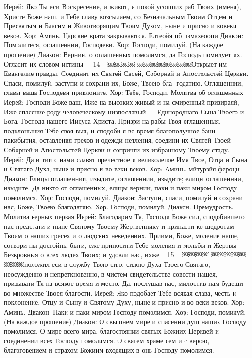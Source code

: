 Иерей: Яко Ты еси Воскресение, и живот, и покой усопших раб Твоих (имена), Христе Боже наш, и Тебе славу возсылаем, со Безначальным Твоим Отцем и Пресвятым и Благим и Животворящим Твоим Духом, ныне и присно и вовеки веков. Хор: Аминь.
Царские врата закрываются.
Елтеойя пб пзмахеооци
Диакон: Помолитеся, оглашеннии, Господеви.
Хор: Господи, помилуй. (На каждое прошение) Диакон: Вернии, о оглашенных помолимся, да Господь помилует их.
Огласит их словом истины.
~ 14 ~
￼￼￼￼
￼￼￼￼￼￼￼￼Открыет им Евангелие правды.
Соединит их Святей Своей, Соборней и Апостольстей Церкви. Спаси, помилуй, заступи и сохрани их, Боже, Твоею бла- годатию.
Оглашеннии, главы ваша Господеви приклоните.
Хор: Тебе, Господи.
Молитва об оглашенных
Иерей: Господи Боже ваш, Иже на высоких живый и на смиренный призираяй, Иже спасение роду человеческому низпославый — Единороднаго Сына Твоего и Бога, Господа нашего Иисуса Христа. Призри на рабы Твоя оглашенныя, подклоньшия Тебе своя выя, и сподоби я во время благополучное бани пакибытия, оставления грехов и одежди нетления, соедини их Святей Твоей Соборней и Апостольстей Церкви и сопричти их избранному Твоему стаду.
Иерей: Да и тии с нами славят пречестное и великолепое Имя Твое, Отца и Сына и Святаго Духа, ныне и присно и во веки веков.
Хор: Аминь.
мйтурзйя фероци
Диакон: Елицы оглашеннии, изыдите, оглашеннии, изыдите; елицы оглашеннии, изыдите. Да никто от оглашенных, елицы вернии, паки и паки миром Господу помолимся.
Хор: Господи, помилуй.
Диакон: Заступи, спаси, помилуй и сохрани нас, Боже, Твоею благодатию.
Хор: Господи, помилуй.
Диакон: Премудрость.
Молитва верных первая
Иерей: Благодарим Тя, Господи Боже сил, сподобившего нас предстати и ныне Святому Твоему Жертвеннику и припасти ко щедротам Твоим о наших гресех и о людских неведениих. Приими, Боже, моление наше, сотвори ны достойны быти, еже приносити Тебе моления и мольбы и Жертвы Безкровныя о всех людех Твоих; и удовли нас, ихже
~ 15 ~
￼￼￼￼
￼￼￼￼￼￼￼￼положил еси в службу Твою сию, силою Духа Твоего Святаго, неосужденно и непреткновенно, в чистем свидетельстве совести нашея, призывати Тя на всякое время и место. Да, послушав нас, милостив нам будеши во множестве Твоея благости.
Иерей: Яко подобает Тебе всякая слава, честь и поклонение, Отцу и Сыну и Святому Духу, ныне и присно и во веки веков. Хор: Аминь.
Диакон: Паки и паки миром Господу помолимся.
Хор: Господи, помилуй. (На каждое прошение)
Диакон: О свышнем мире и спасении душ наших Господу помолимся.
О мире всего мира, благостоянии святых Божиих Церквей и соединении всех Господу помолимся.
О святем храме сем и с верою, благоговением и страхом Божиим входящих в онь Господу помолимся.
